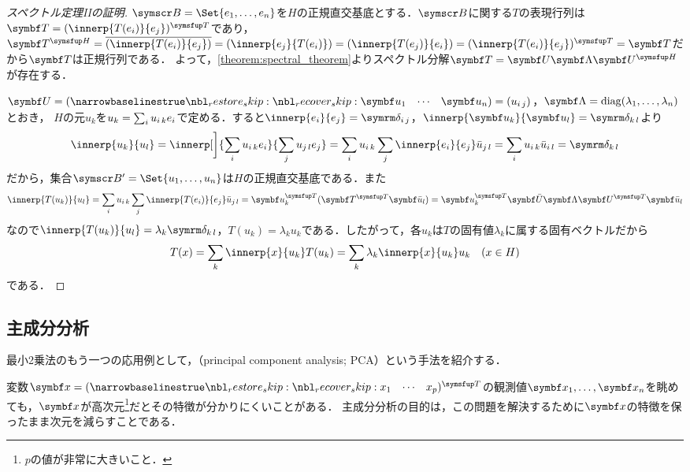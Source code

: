 \documentclass[../../main]{subfiles}
\begin{document}
\begin{proof}[スペクトル定理IIの証明]
  \(\basis{B}=\Set{e_1,\dots,e_n}\)を\(H\)の正規直交基底とする．\(\basis{B}\)に関する\(T\)の表現行列は\(\mat{T}=\trps{\matfence{\innerp{T(e_i)}{e_j}}}\)であり，
  \(\htrps{\mat{T}}=\conj*{\matfence{\innerp{T(e_i)}{e_j}}}=\matfence{\innerp{e_j}{T(e_i)}}=\matfence{\innerp{T(e_j)}{e_i}}=\trps{\matfence{\innerp{T(e_i)}{e_j}}}=\mat{T}\)だから\(\mat{T}\)は正規行列である．
  よって，\cref{theorem:spectral_theorem}よりスペクトル分解\(\mat{T}=\mat{U}\mat{\Lambda}\htrps{\mat{U}}\)が存在する．

  \(\mat{U}=\rowvect{\vect{u}_1 & \cdots & \vect{u}_n}=\matfence{\midx{u}{i}{j}}\)，\(\mat{\Lambda}=\diag(\lambda_1,\dots,\lambda_n)\)とおき，
  \(H\)の元\(u_k\)を\(u_k=\sum_iu_{i\,k}e_i\)で定める．すると\(\innerp{e_i}{e_j}=\kdelta{i}{j}\)，\(\innerp{\vect{u}_k}{\vect{u}_l}=\kdelta{k}{l}\)より
  \[
    \innerp{u_k}{u_l} = \innerp[\bigg]{\sum_i\midx{u}{i}{k}e_i}{\sum_j\midx{u}{j}{l}e_j}
    = \sum_i\midx{u}{i}{k}\sum_j\innerp{e_i}{e_j}\midx{\conj{u}}{j}{l}
    = \sum_i\midx{u}{i}{k}\midx{\conj{u}}{i}{l}
    = \kdelta{k}{l}
  \]
  だから，集合\(\basis{B}'=\Set{u_1,\dots,u_n}\)は\(H\)の正規直交基底である．また
  \[
    \innerp{T(u_k)}{u_l} = \sum_i\midx{u}{i}{k}\sum_j\innerp{T(e_i)}{e_j}\midx{\conj{u}}{j}{l}
    = \trps{\vect{u}_k}(\trps{\mat{T}}\vect{\conj{u}}_l)
    = \trps{\vect{u}_k}\mat{\conj{U}}\mat{\Lambda}\trps{\mat{U}}\vect{\conj{u}}_l
  \]
  なので\(\innerp{T(u_k)}{u_l}=\lambda_k\kdelta{k}{l}\)，\(T(u_k)=\lambda_ku_k\)である．したがって，各\(u_k\)は\(T\)の固有値\(\lambda_k\)に属する固有ベクトルだから
  \[
    T(x) = \sum_k\innerp{x}{u_k}T(u_k)
    = \sum_k\lambda_k\innerp{x}{u_k}u_k\quad(x\in H)
  \]
  である．
\end{proof}

\subsection{主成分分析}

最小2乗法のもう一つの応用例として，（principal component analysis; PCA）という手法を紹介する．

変数\(\vect{x}=\trps{\rowvect{x_1 & \cdots & x_p}}\)の観測値\(\vect{x}_1,\dots,\vect{x}_n\)を眺めても，\(\vect{x}\)が高次元\footnote{\(p\)の値が非常に大きいこと．}だとその特徴が分かりにくいことがある．
主成分分析の目的は，この問題を解決するために\(\vect{x}\)の特徴を保ったまま次元を減らすことである．
\end{document}
